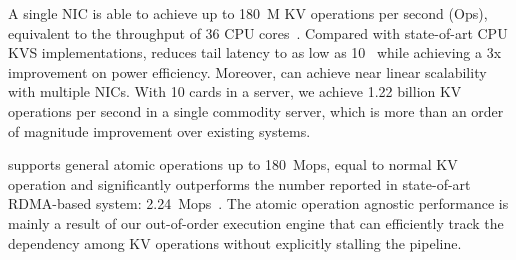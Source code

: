 %
A single NIC \oursys{} is able to achieve up to 180~M KV operations per second (Ops), equivalent to the throughput of 36 CPU cores~\cite{li2016full}. Compared with state-of-art CPU KVS implementations, \oursys{} reduces tail latency to as low as 10~\mus{} while achieving a 3x improvement on power efficiency. Moreover, \oursys{} can achieve near linear scalability with multiple NICs. With 10 \ournic{} cards in a server, we achieve 1.22 billion KV operations per second in a single commodity server, which is more than an order of magnitude improvement over existing systems.

\oursys{} supports general atomic operations up to 180~Mops, equal to normal KV operation and significantly outperforms the number reported in state-of-art RDMA-based system: 2.24~Mops~\cite{kalia2014using}. The atomic operation agnostic performance is mainly a result of our out-of-order execution engine that can efficiently track the dependency among KV operations without explicitly stalling the pipeline.

